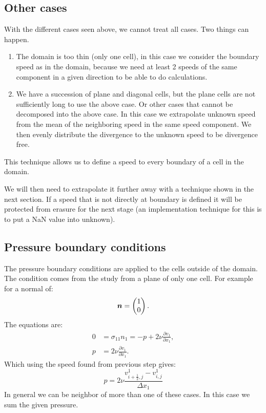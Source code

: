 \subsection{Other cases}
With the different cases seen above, we cannot treat all cases. Two things can happen.
\begin{enumerate}
	\item The domain is too thin (only one cell), in this case we consider the boundary speed as in the domain,
	because we need at least 2 speeds of the same component in a given direction to be able to do calculations.
	\item We have a succession of plane and diagonal cells, but the plane cells are not sufficiently long to use the above case.
	 Or other cases that cannot be decomposed into the above case.
	In this case we extrapolate unknown speed from the mean of the neighboring speed in the same speed component.
	We then evenly distribute the divergence to the unknown speed to be divergence free.
\end{enumerate}
This technique allows us to define a speed to every boundary of a cell in the domain.

We will then need to extrapolate it further away with a technique shown in the next section.
If a speed that is not directly at boundary is defined it will be protected from erasure for the next stage (an implementation technique for this
is to put a NaN value into unknown).

\subsection{Pressure boundary conditions}

The pressure boundary conditions are applied to the cells outside of the domain.
The condition comes from the study from a plane of only one cell.
For example for a normal of:
\begin{equation}
	{\boldsymbol {n}}=\begin{pmatrix}
			1\\
			0
		\end{pmatrix}.
\end{equation}
The equations are:
\begin{align}
	0&=\sigma_{11}n_{1}=-p+2\nu\frac{\partial v_{1}}{\partial x_{1}},\\
	p&=2\nu\frac{\partial v_{1}}{\partial x_{1}}.
\end{align}
Which using the speed found from previous step gives:
\begin{equation}
	p=2\nu\frac{v^{1}_{i+\frac{1}{2},j}-v^{1}_{i,j}}{\Delta x_{1}}
\end{equation}
In general we can be neighbor of more than one of these cases.
In this case we sum the given pressure.

